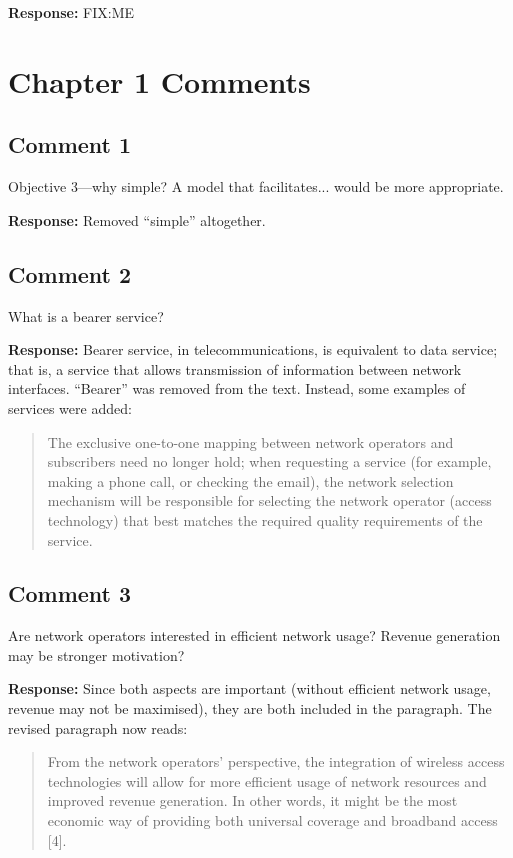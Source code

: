 \documentclass[10pt,a4paper,notitlepage]{article}
\numberwithin{equation}{section}
\begin{document}
\textbf{Response:}
FIX:ME

\clearpage

\setcounter{section}{0}
\renewcommand{\thesection}{C\arabic{section}}
\renewcommand{\thesubsection}{C\arabic{section}.\arabic{subsection}}
\section{Chapter 1 Comments}
\subsection{Comment 1}
Objective 3---why simple? A model that facilitates... would be more appropriate.

\textbf{Response:}
Removed ``simple'' altogether.

\subsection{Comment 2}
What is a bearer service?

\textbf{Response:}
Bearer service, in telecommunications, is equivalent to data service; that is, a service that allows transmission of information between network interfaces. ``Bearer'' was removed from the text. Instead, some examples of services were added:
\begin{quote}
The exclusive one-to-one mapping between network operators and subscribers need no longer hold; when requesting a service (for example, making a phone call, or checking the email), the network selection mechanism will be responsible for selecting the network operator (access technology) that best matches the required quality requirements of the service.
\end{quote}

\subsection{Comment 3}
Are network operators interested in efficient network usage? Revenue generation may be stronger motivation?

\textbf{Response:}
Since both aspects are important (without efficient network usage, revenue may not be maximised), they are both included in the paragraph. The revised paragraph now reads:
\begin{quote}
From the network operators' perspective, the integration of wireless access technologies will allow for more efficient usage of network resources and improved revenue generation. In other words, it might be the most economic way of providing both universal coverage and broadband access [4].
\end{quote}
\end{document}

